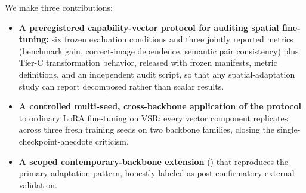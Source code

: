 We make three contributions:
\begin{itemize}[leftmargin=*]
  \item \textbf{A preregistered capability-vector protocol for auditing
        spatial fine-tuning:} six frozen evaluation conditions and three
        jointly reported metrics (benchmark gain, correct-image
        dependence, semantic pair consistency) plus Tier-C transformation
        behavior, released with frozen manifests, metric definitions, and
        an independent audit script, so that any spatial-adaptation study
        can report decomposed rather than scalar results.
  \item \textbf{A controlled multi-seed, cross-backbone application of the
        protocol} to ordinary LoRA fine-tuning on VSR: every vector
        component replicates across three fresh training seeds on two
        backbone families, closing the single-checkpoint-anecdote
        criticism.
  \item \textbf{A scoped contemporary-backbone extension} (\qwennew{})
        that reproduces the primary adaptation pattern, honestly labeled as
        post-confirmatory external validation.
\end{itemize}
